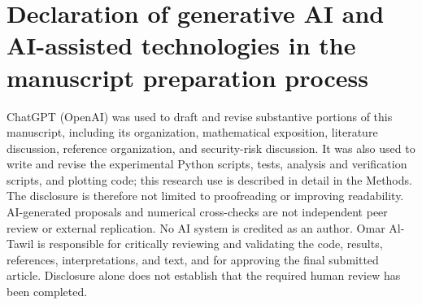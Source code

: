 \section*{Declaration of generative AI and AI-assisted technologies in the manuscript preparation process}
ChatGPT (OpenAI) was used to draft and revise substantive portions of this manuscript, including its organization, mathematical exposition, literature discussion, reference organization, and security-risk discussion. It was also used to write and revise the experimental Python scripts, tests, analysis and verification scripts, and plotting code; this research use is described in detail in the Methods. The disclosure is therefore not limited to proofreading or improving readability. AI-generated proposals and numerical cross-checks are not independent peer review or external replication. No AI system is credited as an author. Omar Al-Tawil is responsible for critically reviewing and validating the code, results, references, interpretations, and text, and for approving the final submitted article. Disclosure alone does not establish that the required human review has been completed.

